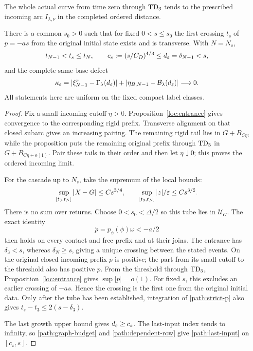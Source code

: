 \begin{lemma}
\label{path:first-section}
The whole actual curve from time zero through $\mathrm{TD}_3$ tends to the
prescribed incoming arc $I_{\lambda,\nu}$ in the completed ordered
distance.

There is a common $s_0>0$ such that for fixed $0<s\le s_0$ the
first crossing $t_s$ of $p=-as$ from the original initial state
exists and is transverse.  With $N=N_s$,
\begin{equation}
 t_{N-1}<t_s\le t_N,
 \qquad c_s:=(s/C_D)^{4/3}\le d_\varepsilon=\delta_{N-1}<s,
 \label{path:section-location}
\end{equation}
and the complete same-base defect
\begin{equation}
 \kappa_\varepsilon=
 |\xi_{N-1}^r-\Gamma_\lambda(d_\varepsilon)|+
 |\eta_{B,N-1}-\mathcal B_\lambda(d_\varepsilon)|\longrightarrow0.
 \label{path:last-input}
\end{equation}
All statements here are uniform on the fixed compact label classes.
\end{lemma}

\begin{proof}
Fix a small incoming cutoff $\eta>0$. Proposition~\ref{loc:entrance}
gives convergence to the corresponding rigid prefix. Transverse
alignment on that closed subarc gives an increasing pairing.
The remaining rigid tail lies in $G+B_{C\eta}$, while the proposition
puts the remaining original prefix through $\mathrm{TD}_3$ in
$G+B_{C\eta+o(1)}$. Pair these tails in their order and then let
$\eta\downarrow0$; this proves the ordered incoming limit.

For the cascade up to $N_s$, take the supremum of the local bounds:
\begin{equation}
 \sup_{[t_3,t_N]}|X-G|\le Cs^{3/4},\qquad
 \sup_{[t_3,t_N]}|z|/\varepsilon\le Cs^{3/2}.
 \label{path:common-tube}
\end{equation}
There is no sum over returns.  Choose $0<s_0<\Delta/2$ so this tube lies in
$\mathcal U_G$.  The exact identity
\begin{equation}
 \dot p=p_\phi(\phi)\omega<-a/2
 \label{path:strict-p}
\end{equation}
then holds on every contact and free prefix and at their joins.
The entrance has $\delta_3<s$, whereas $\delta_N\ge s$, giving a
unique crossing between the stated events.  On the original closed
incoming prefix $p$ is positive; the part from its small cutoff to
the threshold also has positive $p$.  From the threshold through
$\mathrm{TD}_3$, Proposition~\ref{loc:entrance} gives $\sup|p|=o(1)$.  For fixed
$s$, this excludes an earlier crossing of $-as$.  Hence the crossing
is the first one from the original initial data.  Only after the
tube has been established, integration of \eqref{path:strict-p}
also gives $t_s-t_3\le2(s-\delta_3)$.

The last growth upper bound gives $d_\varepsilon\ge c_s$.  The last-input
index tends to infinity, so \eqref{path:graph-budget} and
\eqref{path:dependent-row} give \eqref{path:last-input} on
$[c_s,s]$.
\end{proof}

